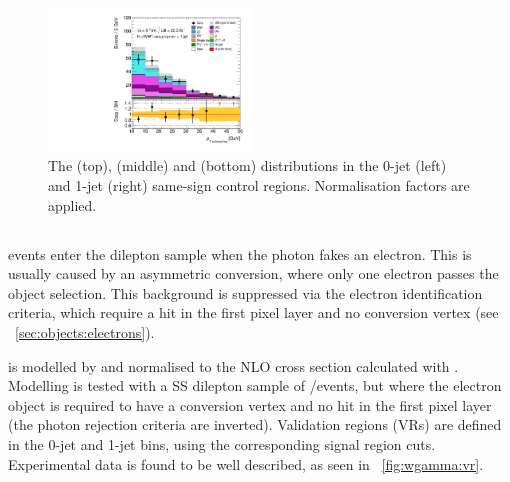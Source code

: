 \begin{figure}[p]
	\hfill
	\includegraphics[width=0.48\textwidth]{tex/backgrounds/emme_CutFRecoil_1jet_sscr_lepPtSubLead_zoom_mh125_lin}
	\caption{The \mt (top), \mll (middle) and \ptsubleadlep (bottom) distributions in the 
	0-jet (left) and 1-jet (right) same-sign control regions. Normalisation factors are 
	applied.}
	\label{fig:sscr}
\end{figure}



\subsection{\Wgamma}
\label{sec:diboson:wgamma}

\Wgamma events enter the dilepton sample when the photon fakes an electron. This is usually 
caused by an asymmetric \HepProcess{\Pphoton \HepTo \epluseminus} conversion, where only one 
electron passes the object selection. This background is suppressed via the electron 
identification criteria, which require a hit in the first pixel layer and no conversion 
vertex (see \Section~\ref{sec:objects:electrons}).

\Wgamma is modelled by \meps{\alpgen}{\fherwig} and normalised to the NLO cross section 
calculated with \mcfm. Modelling is tested with a SS dilepton sample of \emch/\mech events, 
but where the electron object is required to have a conversion vertex and no hit in the first 
pixel layer (\ie the photon rejection criteria are inverted). Validation regions (VRs) are 
defined in the 0-jet and 1-jet bins, using the corresponding signal region cuts. Experimental 
data is found to be well described, as seen in \Figure~\ref{fig:wgamma:vr}.

